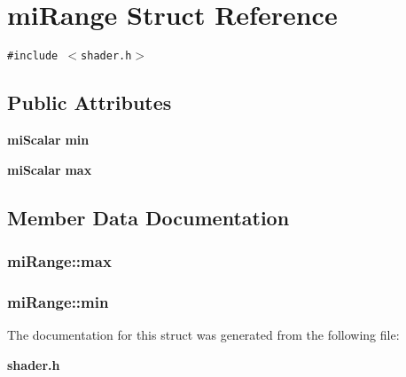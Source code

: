 \section{mi\-Range Struct Reference}
\label{structmiRange}
{\tt \#include $<$shader.h$>$}

\subsection*{Public Attributes}
\begin{CompactItemize}
\item 
{\bf mi\-Scalar} {\bf min}
\item 
{\bf mi\-Scalar} {\bf max}
\end{CompactItemize}


\subsection{Member Data Documentation}
\subsubsection{ {\bf mi\-Range::max}}\label{structmiRange_o1}


\subsubsection{ {\bf mi\-Range::min}}\label{structmiRange_o0}




The documentation for this struct was generated from the following file:\begin{CompactItemize}
\item 
{\bf shader.h}\end{CompactItemize}
